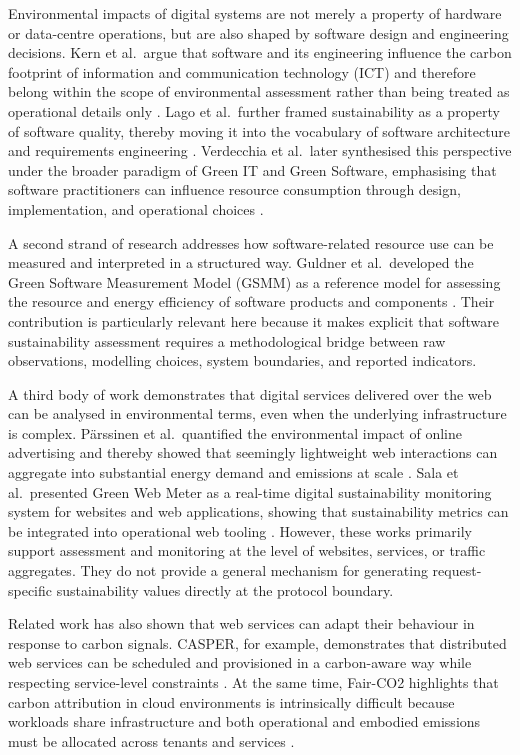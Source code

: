 Environmental impacts of digital systems are not merely a property of hardware or data-centre operations, but are also shaped by software design and engineering decisions. Kern et al.\ argue that software and its engineering influence the carbon footprint of information and communication technology (ICT) and therefore belong within the scope of environmental assessment rather than being treated as operational details only \cite{kern2015impacts}. Lago et al.\ further framed sustainability as a property of software quality, thereby moving it into the vocabulary of software architecture and requirements engineering \cite{lago2015framing}. Verdecchia et al.\ later synthesised this perspective under the broader paradigm of Green IT and Green Software, emphasising that software practitioners can influence resource consumption through design, implementation, and operational choices \cite{verdecchia2021green}.

A second strand of research addresses how software-related resource use can be measured and interpreted in a structured way. Guldner et al.\ developed the Green Software Measurement Model (GSMM) as a reference model for assessing the resource and energy efficiency of software products and components \cite{guldner2024gsmm}. Their contribution is particularly relevant here because it makes explicit that software sustainability assessment requires a methodological bridge between raw observations, modelling choices, system boundaries, and reported indicators.

A third body of work demonstrates that digital services delivered over the web can be analysed in environmental terms, even when the underlying infrastructure is complex. Pärssinen et al.\ quantified the environmental impact of online advertising and thereby showed that seemingly lightweight web interactions can aggregate into substantial energy demand and emissions at scale \cite{parssinen2018onlineadvertising}. Sala et al.\ presented Green Web Meter as a real-time digital sustainability monitoring system for websites and web applications, showing that sustainability metrics can be integrated into operational web tooling \cite{sala2024greenwebmeter}. However, these works primarily support assessment and monitoring at the level of websites, services, or traffic aggregates. They do not provide a general mechanism for generating request-specific sustainability values directly at the protocol boundary.

Related work has also shown that web services can adapt their behaviour in response to carbon signals. CASPER, for example, demonstrates that distributed web services can be scheduled and provisioned in a carbon-aware way while respecting service-level constraints \cite{souza2023casper}. At the same time, Fair-CO2 highlights that carbon attribution in cloud environments is intrinsically difficult because workloads share infrastructure and both operational and embodied emissions must be allocated across tenants and services \cite{han2025fairco2}.

